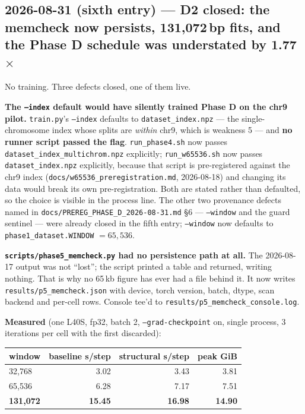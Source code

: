 \documentclass[11pt,a4paper]{article}
\newcommand{\code}[1]{\texttt{\small #1}}
\begin{document}
\subsection*{2026-08-31 (sixth entry) --- D2 closed: the memcheck now persists,
131{,}072\,bp fits, and the Phase D schedule was understated by 1.77$\times$}

No training. Three defects closed, one of them live.

\textbf{The \code{--index} default would have silently trained Phase D on the
chr9 pilot.} \code{train.py}'s \code{--index} defaults to
\code{dataset\_index.npz} --- the single-chromosome index whose splits are
\emph{within} chr9, which is weakness 5 --- and \textbf{no runner script passed
the flag}. \code{run\_phase4.sh} now passes
\code{dataset\_index\_multichrom.npz} explicitly; \code{run\_w65536.sh} now
passes \code{dataset\_index.npz} explicitly, because that script is
pre-registered against the chr9 index (\code{docs/w65536\_preregistration.md},
2026-08-18) and changing its data would break its own pre-registration. Both
are stated rather than defaulted, so the choice is visible in the process line.
The other two provenance defects named in \code{docs/PREREG\_PHASE\_D\_2026-08-31.md}
\S6 --- \code{--window} and the guard sentinel --- were already closed in the
fifth entry; \code{--window} now defaults to \code{phase1\_dataset.WINDOW}
$= 65{,}536$.

\textbf{\code{scripts/phase5\_memcheck.py} had no persistence path at all.} The
2026-08-17 output was not ``lost''; the script printed a table and returned,
writing nothing. That is why no 65\,kb figure has ever had a file behind it.
It now writes \code{results/p5\_memcheck.json} with device, torch version,
batch, dtype, scan backend and per-cell rows. Console tee'd to
\code{results/p5\_memcheck\_console.log}.

\textbf{Measured} (one L40S, fp32, batch 2, \code{--grad-checkpoint} on, single
process, 3 iterations per cell with the first discarded):

\begin{center}
\begin{tabular}{lrrr}
\hline
window & baseline s/step & structural s/step & peak GiB \\
\hline
32{,}768 & 3.02 & 3.43 & 3.81 \\
65{,}536 & 6.28 & 7.17 & 7.51 \\
\textbf{131{,}072} & \textbf{15.45} & \textbf{16.98} & \textbf{14.90} \\
\hline
\end{tabular}
\end{center}
\end{document}
